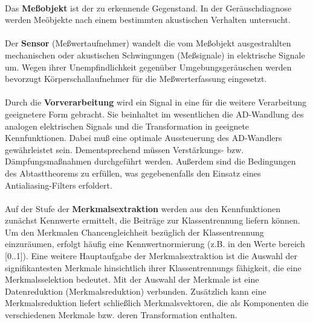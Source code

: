 \paragraph{}
Das \textbf{Me\ss{}objekt} ist der zu erkennende Gegenstand. In der 
Ger\"auschdiagnose werden Me\"objekte nach einem bestimmten akustischen
Verhalten untersucht.

\paragraph{}
Der \textbf{Sensor} (Me\ss{}wertaufnehmer) wandelt die vom Me\ss{}objekt
ausgestrahlten mechanischen oder akustischen Schwingungen (Me\ss{}signale) in
elektrische Signale um. Wegen ihrer Unempfindlichkeit gegen\"uber
Umgebungsger\"auschen werden bevorzugt K\"orperschallaufnehmer f\"ur die
Me\ss{}werterfassung eingesetzt.

\paragraph{}
Durch die \textbf{Vorverarbeitung} wird ein Signal in eine f\"ur die weitere
Verarbeitung geeignetere Form gebracht. Sie beinhaltet im wesentlichen die
AD-Wandlung des analogen elektrischen Signals und die Transformation in
geeignete Kennfunktionen. Dabei mu\ss{} eine optimale Aussteuerung des
AD-Wandlers gew\"ahrleistet sein. Dementsprechend m\"ussen Verst\"arkungs-
bzw. D\"ampfungsma\ss{}nahmen durchgef\"uhrt werden. Au\ss{}erdem sind die
Bedingungen des Abtasttheorems zu erf\"ullen, was gegebenenfalls den Einsatz
eines Antialiasing-Filters erfoldert.

\paragraph{}
Auf der Stufe der \textbf{Merkmalsextraktion} werden aus den Kennfunktionen
zun\"achst Kennwerte ermittelt, die Beitr\"age zur Klassentrennung liefern
k\"onnen. Um den Merkmalen Chancengleichheit bez\"uglich der Klassentrennung
einzur\"aumen, erfolgt h\"aufig eine Kennwertnormierung (z.B. in den Werte%
bereich [0..1]). Eine weitere Hauptaufgabe der Merkmalsextraktion ist die
Auswahl der signifikantesten Merkmale hinsichtlich ihrer Klassentrennungs%
f\"ahigkeit, die eine Merkmalsselektion bedeutet. Mit der Auswahl der Merkmale
ist eine Datenreduktion (Merkmalsreduktion) verbunden. Zus\"atzlich kann eine
Merkmalsreduktion liefert schlie\ss{}lich Merkmalsvektoren, die als Komponenten
die verschiedenen Merkmale bzw. deren Transformation enthalten.

